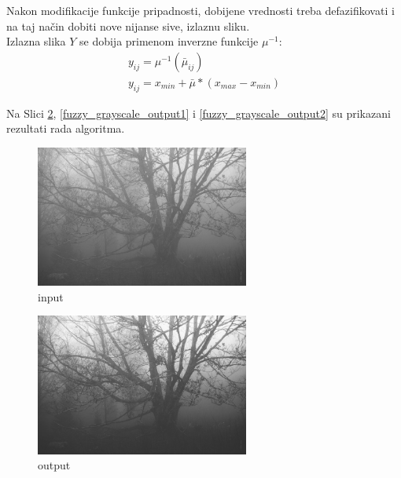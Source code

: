 \documentclass[12pt,a4paper]{article}
\theoremstyle{definition}
\theoremstyle{remark}
\theoremstyle{plain}
\begin{document}
Nakon modifikacije funkcije pripadnosti, dobijene vrednosti treba defazifikovati i na taj na\v cin dobiti nove nijanse sive, izlaznu sliku.\\
Izlazna slika $Y$ se dobija primenom inverzne funkcije $\mu^{-1}$:\\
\begin{align*}
  y_{ij} = \mu^{-1}(\bar\mu_{ij})\\
  y_{ij} = x_{min} + \bar\mu * (x_{max} - x_{min})
\end{align*}

\newpage
Na Slici \ref{tree_fuzzy_grayscale_output}, \ref{fuzzy_grayscale_output1} i \ref{fuzzy_grayscale_output2} su prikazani rezultati rada algoritma.

\begin{multicols}{2}
\begin{figure}[H]
\centering
\includegraphics[width=7cm]{images/tree.jpg}
  \caption{input}\label{tree_fuzzy_grayscale_input}
\end{figure}
\columnbreak
\begin{figure}[H]
\centering
\includegraphics[width=7cm]{images/fuzzy_grayscale_0.jpg}
  \caption{output}\label{tree_fuzzy_grayscale_output}
\end{figure}
\end{multicols}
\end{document}
